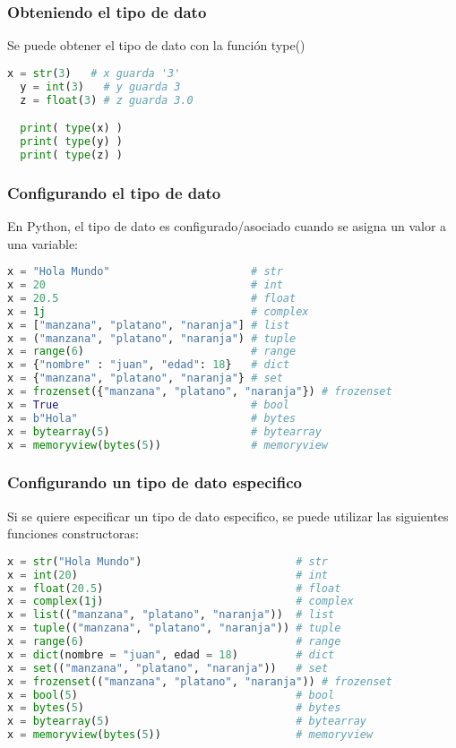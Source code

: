 \begin{frame}[fragile]
  \frametitle{Obteniendo el tipo de dato}

  Se puede obtener el tipo de dato con la función
  \textcolor{codeKeyword2}{type}()

  \vspace{\baselineskip}
  \begin{lstlisting}[language=Python]
  x = str(3)   # x guarda '3'
  y = int(3)   # y guarda 3
  z = float(3) # z guarda 3.0

  print( type(x) )
  print( type(y) )
  print( type(z) )
  \end{lstlisting}
\end{frame}

\begin{frame}[fragile]
  \frametitle{Configurando el tipo de dato}

  \vspace{\baselineskip}
  En Python, el tipo de dato es configurado/asociado cuando se asigna un
  valor a una variable:

  \begin{lstlisting}[language=Python]
x = "Hola Mundo"                      # str
x = 20                                # int
x = 20.5                              # float
x = 1j                                # complex
x = ["manzana", "platano", "naranja"] # list
x = ("manzana", "platano", "naranja") # tuple
x = range(6)                          # range
x = {"nombre" : "juan", "edad": 18}   # dict
x = {"manzana", "platano", "naranja"} # set
x = frozenset({"manzana", "platano", "naranja"}) # frozenset
x = True                              # bool
x = b"Hola"                           # bytes
x = bytearray(5)                      # bytearray
x = memoryview(bytes(5))              # memoryview
  \end{lstlisting}
\end{frame}

\begin{frame}[fragile]
  \frametitle{Configurando un tipo de dato especifico}

  \vspace{\baselineskip}
  Si se quiere especificar un tipo de dato especifico, se puede utilizar
  las siguientes funciones constructoras:

  \begin{lstlisting}[language=Python]
x = str("Hola Mundo")                        # str
x = int(20)                                  # int
x = float(20.5)                              # float
x = complex(1j)                              # complex
x = list(("manzana", "platano", "naranja"))  # list
x = tuple(("manzana", "platano", "naranja")) # tuple
x = range(6)                                 # range
x = dict(nombre = "juan", edad = 18)         # dict
x = set(("manzana", "platano", "naranja"))   # set
x = frozenset(("manzana", "platano", "naranja")) # frozenset
x = bool(5)                                  # bool
x = bytes(5)                                 # bytes
x = bytearray(5)                             # bytearray
x = memoryview(bytes(5))                     # memoryview
  \end{lstlisting}
\end{frame}

